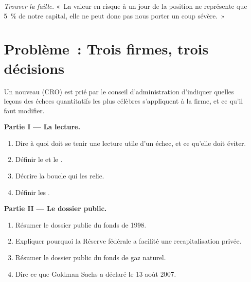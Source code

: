 \begin{exercise}[$\star\star\star$]\label{exo:fm:case-studies-i:8}
\emph{Trouver la faille.} «~La valeur en risque à un jour de la position ne représente que 5~\% de notre capital, elle ne peut donc pas nous porter un coup sévère.~»
\end{exercise}

\section{Problème~: Trois firmes, trois décisions}

\begin{problem}\label{pb:fm:case-studies-i:1}
Un nouveau  (CRO) est prié par le conseil d'administration d'indiquer quelles leçons des échecs quantitatifs les plus célèbres s'appliquent à la firme, et ce qu'il faut modifier.

\medskip\noindent\textbf{Partie I --- La lecture.}
\begin{enumerate}
\item Dire à quoi doit se tenir une lecture utile d'un échec, et ce qu'elle doit éviter.
\item Définir le  et le .
\item Décrire la boucle qui les relie.
\item Définir les .
\end{enumerate}

\medskip\noindent\textbf{Partie II --- Le dossier public.}
\begin{enumerate}[resume]
\item Résumer le dossier public du fonds de 1998.
\item Expliquer pourquoi la Réserve fédérale a facilité une recapitalisation privée.
\item Résumer le dossier public du fonds de gaz naturel.
\item Dire ce que Goldman Sachs a déclaré le 13 août 2007.
\end{enumerate}


\end{problem}
